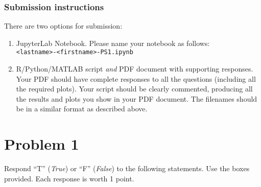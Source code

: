 \documentclass[11pt,twoside]{article}
\newcommand{\?}{\stackrel{?}{=}}
\begin{document}
\subsubsection*{Submission instructions}
There are two options for submission:
\begin{enumerate}
\item JupyterLab Notebook. Please name your notebook as follows: \\ \texttt{<lastname>-<firstname>-PS1.ipynb}
\item R/Python/MATLAB script \textit{and} PDF document with supporting responses.
  Your PDF should have complete responses to all the questions (including all the required plots).
  Your script should be clearly commented, producing all the results and plots you show in your PDF document.
  The filenames should be in a similar format as described above.
\end{enumerate}

\eject

\section*{Problem 1 }
Respond ``T'' ({\it True})  or  ``F'' (\textit{False}) to the following statements. Use the boxes provided. Each response is worth 1 point.

\bigskip
\end{document}
